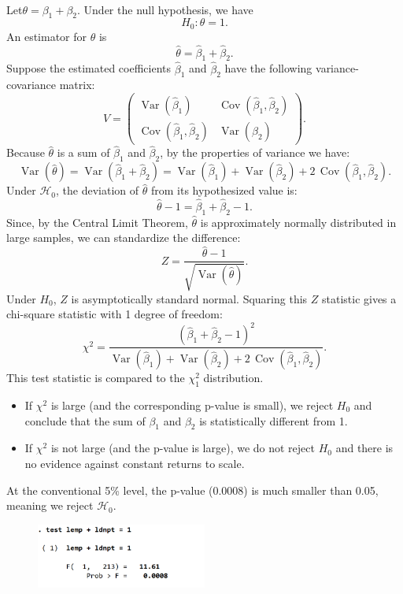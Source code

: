 \documentclass[a4paper,12pt]{article} %
\theoremstyle{nonitalic}
\newenvironment{solution}[1]
  {\renewcommand\theinnercustomsol{#1}\innercustomsol}
  {\endinnercustomsol}
\newcounter{solutionctr}
\renewcommand{\thesolutionctr}{(\alph{solutionctr})}
\newenvironment{autosolution}
  {\stepcounter{solutionctr}\begin{solution}{\thesolutionctr}}
  {\end{solution}}
\begin{document}
\begin{autosolution}
    \

    Let$\theta = \beta_1 + \beta_2$. Under the null hypothesis, we have
    \[
    H_0: \theta = 1.
    \]
    An estimator for $\theta$ is
    \[
    \hat{\theta} = \hat{\beta}_1 + \hat{\beta}_2.
    \]
    Suppose the estimated coefficients $\hat{\beta}_1$ and $\hat{\beta}_2$ have the following variance-covariance matrix:
    \[
    V = \begin{pmatrix}
    \operatorname{Var}(\hat{\beta}_1) & \operatorname{Cov}(\hat{\beta}_1, \hat{\beta}_2) \\
    \operatorname{Cov}(\hat{\beta}_1, \hat{\beta}_2) & \operatorname{Var}(\hat{\beta}_2)
    \end{pmatrix}.
    \]
    Because $\hat{\theta}$ is a sum of $\hat{\beta}_1$ and $\hat{\beta}_2$, by the properties of variance we have:
    \[
    \operatorname{Var}(\hat{\theta}) = \operatorname{Var}(\hat{\beta}_1 + \hat{\beta}_2) = \operatorname{Var}(\hat{\beta}_1) + \operatorname{Var}(\hat{\beta}_2) + 2\,\operatorname{Cov}(\hat{\beta}_1, \hat{\beta}_2).
    \]
    Under $\mathcal{H}_0$, the deviation of $\hat{\theta}$ from its hypothesized value is:
    \[
    \hat{\theta} - 1 = \hat{\beta}_1 + \hat{\beta}_2 - 1.
    \]
    Since, by the Central Limit Theorem, $\hat{\theta}$ is approximately normally distributed in large samples, we can standardize the difference:
    \[
    Z = \frac{\hat{\theta} - 1}{\sqrt{\operatorname{Var}(\hat{\theta})}}.
    \]
    Under $H_0$, $Z$ is asymptotically standard normal. Squaring this $Z$ statistic gives a chi-square statistic with 1 degree of freedom:
    \[
    \chi^2 = \frac{(\hat{\beta}_1 + \hat{\beta}_2 - 1)^2}{\operatorname{Var}(\hat{\beta}_1) + \operatorname{Var}(\hat{\beta}_2) + 2\,\operatorname{Cov}(\hat{\beta}_1, \hat{\beta}_2)}.
    \]
    This test statistic is compared to the $\chi^2_1$ distribution.
    \begin{itemize}
        \item If $\chi^2$ is large (and the corresponding p-value is small), we reject $H_0$ and conclude that the sum of $\beta_1$ and $\beta_2$ is statistically different from 1.  
        \item If $\chi^2$ is not large (and the p-value is large), we do not reject $H_0$ and there is no evidence against constant returns to scale.
    \end{itemize}

    At the conventional 5\% level, the p-value (0.0008) is much smaller than 0.05, meaning we reject $\mathcal{H}_0$.
    \begin{figure}[htbp!]
        \centering
        \includegraphics[width=0.5\textwidth]{F_test.png}
    \end{figure}
\end{autosolution}
\end{document}
